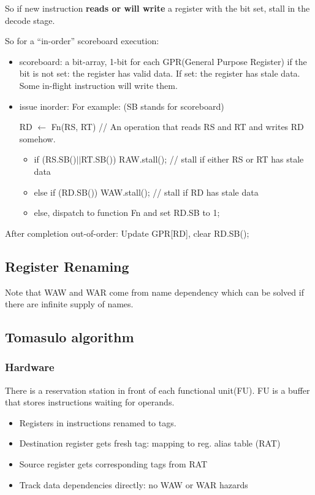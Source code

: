 \documentclass[letterpaper,12pt]{article}
\begin{document}
So if new instruction \textbf{reads or will write} a register with the bit set, stall in the decode stage.

So for a ``in-order'' scoreboard execution:
\begin{itemize}
    \item scoreboard: a bit-array, 1-bit for each GPR(General Purpose Register)
          if the bit is not set: the register has valid data. If set: the register has stale data. Some in-flight instruction will write them.
    \item issue in\-order:
          For example: (SB stands for scoreboard)

          RD $\leftarrow$ Fn(RS, RT) // An operation that reads RS and RT and writes RD somehow.
          \begin{itemize}
              \item if (RS.SB()$||$RT.SB()) RAW.stall(); // stall if either RS or RT has stale data
              \item else if (RD.SB()) WAW.stall(); // stall if RD has stale data
              \item else, dispatch to function Fn and set RD.SB to 1;
          \end{itemize}
\end{itemize}

After completion out-of-order: Update GPR[RD], clear RD.SB();

\subsection{Register Renaming}

Note that WAW and WAR come from name dependency which can be solved if there are infinite supply of names.

\subsection{Tomasulo algorithm}

\subsubsection{Hardware}

There is a reservation station in front of each functional unit(FU). FU is a buffer that stores instructions waiting for operands.

\begin{itemize}
    \item Registers in instructions renamed to tags.
    \item Destination register gets fresh tag: mapping to reg. alias table (RAT)
    \item Source register gets corresponding tags from RAT
    \item Track data dependencies directly: no WAW or WAR hazards
\end{itemize}
\end{document}
